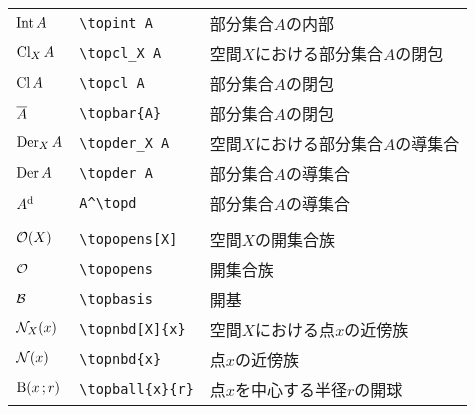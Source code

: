 \documentclass[uplatex, dvipdfmx, a4paper, 12pt, class=jsarticle, crop=false]{standalone}
\begin{document}
\begin{table}[htb]
\begin{tabular}{ll@{\qquad}l}
		$\mathop{\mathrm{Int}}\nolimits A$   & \verb|\topint A|   & 部分集合$A$の内部                  \\
		$\mathop{\mathrm{Cl}}\nolimits_X A$  & \verb|\topcl_X A|  & 空間$X$における部分集合$A$の閉包   \\
		$\mathop{\mathrm{Cl}}\nolimits A$    & \verb|\topcl A|    & 部分集合$A$の閉包                  \\
		$\overline{A}$  & \verb|\topbar{A}|  & 部分集合$A$の閉包                  \\
		$\mathop{\mathrm{Der}}\nolimits_X A$ & \verb|\topder_X A| & 空間$X$における部分集合$A$の導集合 \\
		$\mathop{\mathrm{Der}}\nolimits A$   & \verb|\topder A|   & 部分集合$A$の導集合                \\
		$A^{\mathrm{d}}$     & \verb|A^\topd|     & 部分集合$A$の導集合                \\
		\hline
		\tablesubtitle{位相空間に関する記号} \\
		$\topopens[X]$   & \verb|\topopens[X]|   & 空間$X$の開集合族            \\
		$\topopens$      & \verb|\topopens|      & 開集合族                     \\
		$\mathcal{B}$      & \verb|\topbasis|      & 開基                         \\
		$\topnbd[X]{x}$  & \verb|\topnbd[X]{x}|  & 空間$X$における点$x$の近傍族 \\
		$\topnbd{x}$     & \verb|\topnbd{x}|     & 点$x$の近傍族                \\
		$\topball{x}{r}$ & \verb|\topball{x}{r}| & 点$x$を中心する半径$r$の開球 \\
		\hline
		\hline
	\end{tabular}
\end{table}
\end{document}
